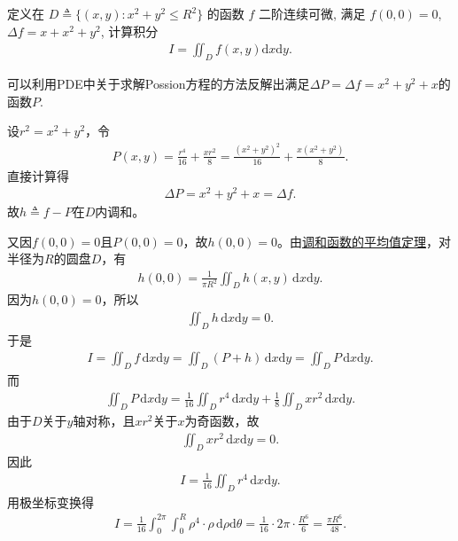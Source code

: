 \documentclass[../../main.tex]{subfiles}%
\begin{document}
\begin{example}
定义在 $D \triangleq \{(x,y): x^2+y^2 \leqslant R^2\}$ 的函数 $f$ 二阶连续可微, 满足 $f(0,0)=0$, $\Delta f = x + x^2 + y^2$, 计算积分
\begin{align}
I = \iint_D f(x,y)\mathrm{d}x\mathrm{d}y.
\label{eq:double_int_f_disk_20260704}
\end{align}
\end{example}
\begin{note}
可以利用PDE中关于求解Possion方程的方法反解出满足$\Delta P=\Delta f=x^2+y^2+x$的函数$P$.
\end{note}
\begin{solution}
设$r^2=x^2+y^2$，令
\begin{align*}
P(x,y)=\frac{r^4}{16}+\frac{xr^2}{8}=\frac{\left( x^2+y^2 \right) ^2}{16}+\frac{x\left( x^2+y^2 \right)}{8}.
\end{align*}
直接计算得
\begin{align*}
\Delta P = x^2+y^2+x=\Delta f.
\end{align*}
故$h\triangleq f-P$在$D$内调和。

又因$f(0,0)=0$且$P(0,0)=0$，故$h(0,0)=0$。由\hyperref[theorem:数分-调和函数的平均值定理]{调和函数的平均值定理}，对半径为$R$的圆盘$D$，有
\begin{align*}
h(0,0)=\frac{1}{\pi R^2}\iint_D h(x,y)\,\mathrm{d}x\mathrm{d}y.
\end{align*}
因为$h(0,0)=0$，所以
\begin{align*}
\iint_D h\,\mathrm{d}x\mathrm{d}y=0.
\end{align*}
于是
\begin{align*}
I=\iint_D f\,\mathrm{d}x\mathrm{d}y
=\iint_D (P+h)\,\mathrm{d}x\mathrm{d}y
=\iint_D P\,\mathrm{d}x\mathrm{d}y.
\end{align*}
而
\begin{align*}
\iint_D P\,\mathrm{d}x\mathrm{d}y
=\frac{1}{16}\iint_D r^4\,\mathrm{d}x\mathrm{d}y
+\frac{1}{8}\iint_D x r^2\,\mathrm{d}x\mathrm{d}y.
\end{align*}
由于$D$关于$y$轴对称，且$x r^2$关于$x$为奇函数，故
\begin{align*}
\iint_D x r^2\,\mathrm{d}x\mathrm{d}y=0.
\end{align*}
因此
\begin{align*}
I=\frac{1}{16}\iint_D r^4\,\mathrm{d}x\mathrm{d}y.
\end{align*}
用极坐标变换得
\begin{align*}
I=\frac{1}{16}\int_{0}^{2\pi}\int_{0}^{R} \rho^4\cdot \rho\,\mathrm{d}\rho\mathrm{d}\theta 
=\frac{1}{16}\cdot 2\pi\cdot \frac{R^6}{6} =\frac{\pi R^6}{48}.
\end{align*}
\end{solution}
\end{document}
